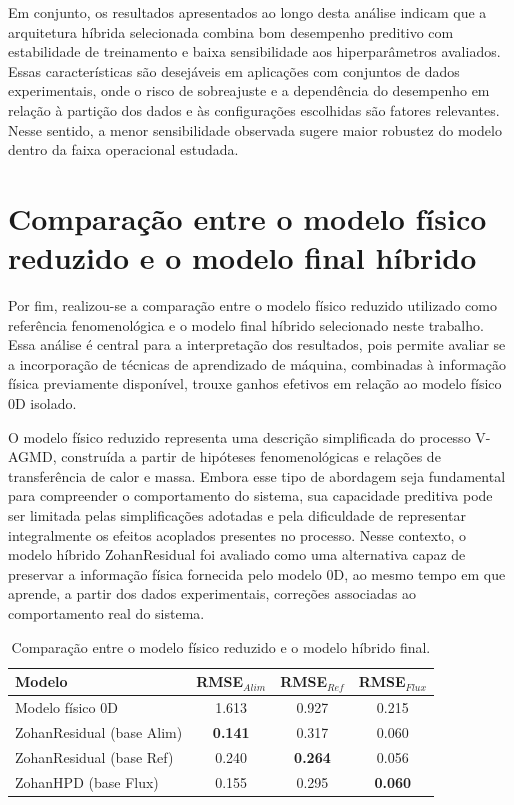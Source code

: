 Em conjunto, os resultados apresentados ao longo desta análise indicam que a arquitetura híbrida selecionada combina bom desempenho preditivo com estabilidade de treinamento e baixa sensibilidade aos hiperparâmetros avaliados. Essas características são desejáveis em aplicações com conjuntos de dados experimentais, onde o risco de sobreajuste e a dependência do desempenho em relação à partição dos dados e às configurações escolhidas são fatores relevantes. Nesse sentido, a menor sensibilidade observada sugere maior robustez do modelo dentro da faixa operacional estudada.
\section{Comparação entre o modelo físico reduzido e o modelo final híbrido}
\label{subsec:comparacao_modelo_fisico_modelo_final}

Por fim, realizou-se a comparação entre o modelo físico reduzido utilizado como referência fenomenológica e o modelo final híbrido selecionado neste trabalho. Essa análise é central para a interpretação dos resultados, pois permite avaliar se a incorporação de técnicas de aprendizado de máquina, combinadas à informação física previamente disponível, trouxe ganhos efetivos em relação ao modelo físico 0D isolado.

O modelo físico reduzido representa uma descrição simplificada do processo V-AGMD, construída a partir de hipóteses fenomenológicas e relações de transferência de calor e massa. Embora esse tipo de abordagem seja fundamental para compreender o comportamento do sistema, sua capacidade preditiva pode ser limitada pelas simplificações adotadas e pela dificuldade de representar integralmente os efeitos acoplados presentes no processo. Nesse contexto, o modelo híbrido ZohanResidual foi avaliado como uma alternativa capaz de preservar a informação física fornecida pelo modelo 0D, ao mesmo tempo em que aprende, a partir dos dados experimentais, correções associadas ao comportamento real do sistema.

\begin{table}[H]
\centering
\caption{Comparação entre o modelo físico reduzido e o modelo híbrido final.}
\begin{tabular}{lccc}
\toprule
Modelo & RMSE$_{Alim}$ & RMSE$_{Ref}$ & RMSE$_{Flux}$ \\
\midrule
Modelo físico 0D & 1.613 & 0.927 & 0.215 \\
ZohanResidual (base Alim) & \textbf{0.141} & 0.317 & 0.060 \\
ZohanResidual (base Ref) & 0.240 & \textbf{0.264} & 0.056 \\
ZohanHPD (base Flux) & 0.155 & 0.295 & \textbf{0.060} \\
\bottomrule
\end{tabular}
\end{table}

